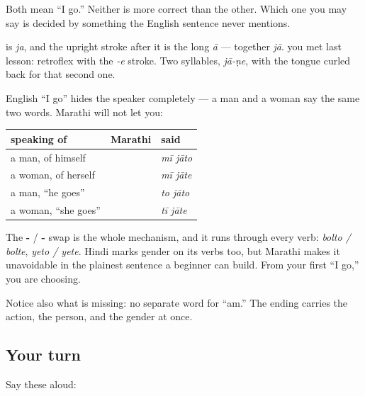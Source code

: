 Both mean \textquotedblleft{}I go.\textquotedblright{} Neither is more correct than the other. Which one you may say is decided by something the English sentence never mentions.

\begin{sounds}
\textbf{} is \emph{ja}, and the upright stroke after it is the long \emph{ā} — together \textbf{} \emph{jā}. \textbf{} you met last lesson: retroflex \textbf{} with the \emph{-e} stroke. Two syllables, \emph{jā-ṇe}, with the tongue curled back for that second one.
\end{sounds}

\begin{grammarlens}[title={Grammar Lens: the ending declares who is speaking}]
English \textquotedblleft{}I go\textquotedblright{} hides the speaker completely — a man and a woman say the same two words. Marathi will not let you:

\noindent
\begin{tabularx}{\linewidth}{@{}>{\raggedright\arraybackslash}X>{\raggedright\arraybackslash}X>{\raggedright\arraybackslash}X@{}}
\toprule
\textbf{speaking of} & \textbf{Marathi} & \textbf{said} \\
\midrule
a man, of himself & \mr{मी} \mr{जातो} & \emph{mī jāto} \\
a woman, of herself & \mr{मी} \mr{जाते} & \emph{mī jāte} \\
a man, \textquotedblleft{}he goes\textquotedblright{} & \mr{तो} \mr{जातो} & \emph{to jāto} \\
a woman, \textquotedblleft{}she goes\textquotedblright{} & \mr{ती} \mr{जाते} & \emph{tī jāte} \\
\bottomrule
\end{tabularx}

The \textbf{-} / \textbf{-} swap is the whole mechanism, and it runs through every verb: \emph{bolto / bolte}, \emph{yeto / yete}. Hindi marks gender on its verbs too, but Marathi makes it unavoidable in the plainest sentence a beginner can build. From your first \textquotedblleft{}I go,\textquotedblright{} you are choosing.

Notice also what is missing: no separate word for \textquotedblleft{}am.\textquotedblright{} The ending carries the action, the person, and the gender at once.
\end{grammarlens}

\subsection*{Your turn}
Say these aloud:

